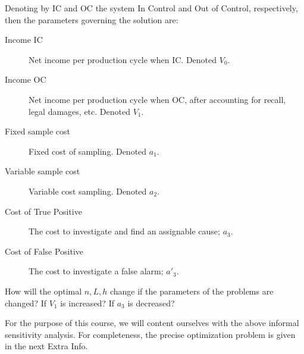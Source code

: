 Denoting by IC and OC the system In Control and Out of Control, respectively, then the parameters governing the solution are:
\begin{description}
\item[Income IC] Net income per production cycle when IC. Denoted $V_0$.
\item[Income OC] Net income per production cycle when OC, after accounting for recall, legal damages, etc. Denoted $V_1$.
\item[Fixed sample cost] Fixed cost of sampling. Denoted $a_1$. 
\item[Variable sample cost] Variable cost sampling. Denoted $a_2$.
\item[Cost of True Positive] The cost to investigate and find an assignable cause; $a_3$.
\item[Cost of False Positive] The cost to investigate a false alarm; $a'_3$.
\end{description}


\begin{think}
How will the optimal $n,L,h$ change if the parameters of the problems are changed?
If $V_1$ is increased?
If $a_3$ is decreased?
\end{think}

For the purpose of this course, we will content ourselves with the above informal sensitivity analysis.
For completeness, the precise optimization problem is given in the next Extra Info.

